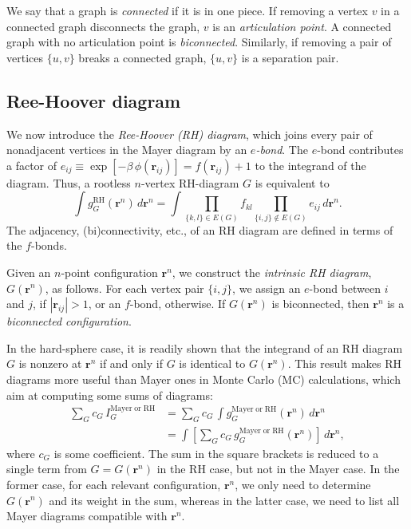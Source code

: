 \documentclass[aip,jcp,preprint,superscriptaddress,showpacs,preprintnumbers,amsmath,amssymb]{revtex4-1}
\numberwithin{equation}{section}
\newcommand{\vct}[1]{\mathbf{#1}}
\providecommand{\vr}{} %
\renewcommand{\vr}{\vct{r}}
\begin{document}
We say that a graph is \emph{connected} if it is in one piece.
%
If removing a vertex $v$ in a connected graph
disconnects the graph,
$v$ is an \emph{articulation point}.
%
A connected graph with no articulation point
is \emph{biconnected}.
%
Similarly, if removing a pair of vertices $\{u, v\}$
breaks a connected graph,
$\{u, v\}$ is a separation pair.





\subsection{Ree-Hoover diagram}




We now introduce the \emph{Ree-Hoover (RH) diagram},
which joins every pair of nonadjacent vertices
in the Mayer diagram by an \emph{$e$-bond}.
%
The $e$-bond contributes a factor of
$e_{ij} \equiv \exp[-\beta\, \phi(\vr_{ij})] = f(\vr_{ij}) + 1$
to the integrand of the diagram.
%
Thus, a rootless $n$-vertex RH-diagram $G$ is equivalent to
%
\[
\int g_G^\mathrm{RH}(\vr^n) \, d\vr^n
=
\int
\prod_{ \{k, l\} \in E(G) } f_{kl}
\prod_{ \{i, j\} \notin E(G) } e_{ij}
\, d\vr^n.
\]
%
The adjacency, (bi)connectivity, etc.,
of an RH diagram are defined in terms of the $f$-bonds.



Given an $n$-point configuration $\vr^n$,
we construct the \emph{intrinsic RH diagram},
$G(\vr^n)$, as follows.
%
For each vertex pair $\{i, j\}$,
we assign an $e$-bond between $i$ and $j$,
if $|\vr_{ij}| > 1$, or an $f$-bond, otherwise.
%
If $G(\vr^n)$ is biconnected,
then $\vr^n$ is a \emph{biconnected configuration}.



In the hard-sphere case,
it is readily shown that the integrand of an RH diagram
$G$ is nonzero at $\vr^n$
if and only if $G$ is identical to $G(\vr^n)$.
%
%
This result makes RH diagrams more useful than Mayer ones
in Monte Carlo (MC) calculations,
which aim at computing some sums of diagrams:
%
\begin{align*}
\sum_G c_G \, I_G^\mathrm{Mayer\; or\; RH}
&=
\sum_G c_G \, \int g_G^\mathrm{Mayer\; or\; RH}(\vr^n) \, d\vr^n
\\
&=
\int
\left[
  \sum_G c_G \, g_G^\mathrm{Mayer\; or\; RH}(\vr^n)
\right]
\, d\vr^n,
\end{align*}
%
where $c_G$ is some coefficient.
%
The sum in the square brackets is reduced to a single term
from $G = G(\vr^n)$ in the RH case, but not in the Mayer case.
%
In the former case,
for each relevant configuration, $\vr^n$,
we only need to determine $G(\vr^n)$
and its weight in the sum,
whereas in the latter case,
we need to list all Mayer diagrams compatible with $\vr^n$.
\end{document}
